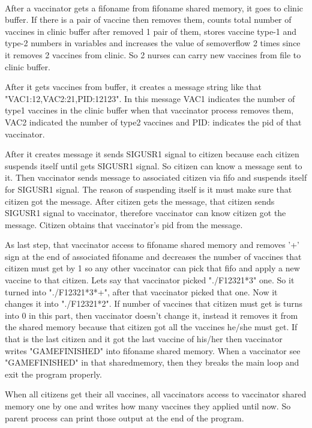 \documentclass{article}
\begin{document}
\\
\par After a vaccinator gets a fifoname from fifoname shared memory, it goes to clinic buffer. If there is a pair of vaccine then removes them, counts total number of vaccines in clinic buffer after removed 1 pair of them, stores vaccine type-1 and type-2 numbers in variables and increases the value of sem\textunderscore overflow 2 times since it removes 2 vaccines from clinic. So 2 nurses can carry new vaccines from file to clinic buffer.
\\
\par After it gets vaccines from buffer, it creates a message string like that "VAC1:12,VAC2:21,PID:12123". In this message VAC1 indicates the number of type1 vaccines in the clinic buffer when that vaccinator process removes them, VAC2 indicated the number of type2 vaccines and PID: indicates the pid of that vaccinator.
\\
\par After it creates message it sends SIGUSR1 signal to citizen because each citizen suspends itself until gets SIGUSR1 signal. So citizen can know a message sent to it. Then vaccinator sends message to associated citizen via fifo and suspends itself for SIGUSR1 signal. The reason of suspending itself is it must make sure that citizen got the message. After citizen gets the message, that citizen sends SIGUSR1 signal to vaccinator, therefore vaccinator can know citizen got the message. Citizen obtains that vaccinator's pid from the message.
\\
\par As last step, that vaccinator access to fifoname shared memory and removes '+' sign at the end of associated fifoname and decreases the number of vaccines that citizen must get by 1 so any other vaccinator can pick that fifo and apply a new vaccine to that citizen. Lets say that vaccinator picked "./F12321*3" one. So it turned into "./F12321*3*+", after that vaccinator picked that one. Now it changes it into "./F12321*2". If number of vaccines that citizen must get is turns into 0 in this part, then vaccinator doesn't change it, instead it removes it from the shared memory because that citizen got all the vaccines he/she must get. If that is the last citizen and it got the last vaccine of his/her then vaccinator writes "GAMEFINISHED" into fifoname shared memory. When a vaccinator see "GAMEFINISHED" in that sharedmemory, then they breaks the main loop and exit the program properly.
\\
\par When all citizens get their all vaccines, all vaccinators access to vaccinator shared memory one by one and writes how many vaccines they applied until now. So parent process can print those output at the end of the program.
\end{document}

